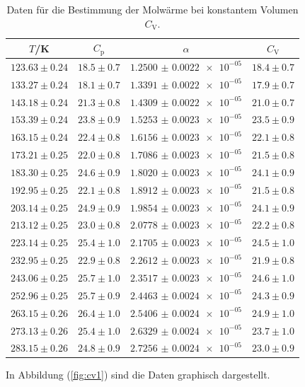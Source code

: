 \begin{table}
  \centering
  \caption{Daten für die Bestimmung der Molwärme bei konstantem Volumen $C_\mathrm{V}$.}
  \label{tab:tab2}
  \begin{tabular}{c c c c}
    \toprule
		$T$/K & $C_\mathrm{p}$ & $\alpha$ & $C_\mathrm{V}$ \\
    \midrule
    $123.63\pm0.24$ & $18.5\pm0.7$ & $\num{1.2500(22)e-05}$ & $18.4\pm0.7$ \\
    $133.27\pm0.24$ & $18.1\pm0.7$ & $\num{1.3391(22)e-05}$ & $17.9\pm0.7$ \\
    $143.18\pm0.24$ & $21.3\pm0.8$ & $\num{1.4309(22)e-05}$ & $21.0\pm0.7$ \\
    $153.39\pm0.24$ & $23.8\pm0.9$ & $\num{1.5253(23)e-05}$ & $23.5\pm0.9$ \\
    $163.15\pm0.24$ & $22.4\pm0.8$ & $\num{1.6156(23)e-05}$ & $22.1\pm0.8$ \\
    $173.21\pm0.25$ & $22.0\pm0.8$ & $\num{1.7086(23)e-05}$ & $21.5\pm0.8$ \\
    $183.30\pm0.25$ & $24.6\pm0.9$ & $\num{1.8020(23)e-05}$ & $24.1\pm0.9$ \\
    $192.95\pm0.25$ & $22.1\pm0.8$ & $\num{1.8912(23)e-05}$ & $21.5\pm0.8$ \\
    $203.14\pm0.25$ & $24.9\pm0.9$ & $\num{1.9854(23)e-05}$ & $24.1\pm0.9$ \\
    $213.12\pm0.25$ & $23.0\pm0.8$ & $\num{2.0778(23)e-05}$ & $22.2\pm0.8$ \\
    $223.14\pm0.25$ & $25.4\pm1.0$ & $\num{2.1705(23)e-05}$ & $24.5\pm1.0$ \\
    $232.95\pm0.25$ & $22.9\pm0.8$ & $\num{2.2612(23)e-05}$ & $21.9\pm0.8$ \\
    $243.06\pm0.25$ & $25.7\pm1.0$ & $\num{2.3517(23)e-05}$ & $24.6\pm1.0$ \\
    $252.96\pm0.25$ & $25.7\pm0.9$ & $\num{2.4463(24)e-05}$ & $24.3\pm0.9$ \\
    $263.15\pm0.26$ & $26.4\pm1.0$ & $\num{2.5406(24)e-05}$ & $24.9\pm1.0$ \\
    $273.13\pm0.26$ & $25.4\pm1.0$ & $\num{2.6329(24)e-05}$ & $23.7\pm1.0$ \\
    $283.15\pm0.26$ & $24.8\pm0.9$ & $\num{2.7256(24)e-05}$ & $23.0\pm0.9$ \\

    \bottomrule
  \end{tabular}
\end{table}
\FloatBarrier
\newpage
\noindent In Abbildung (\ref{fig:cv1}) sind die Daten graphisch dargestellt.
